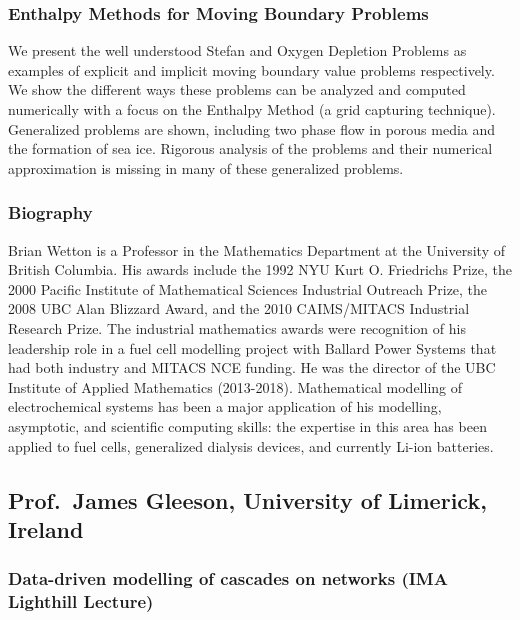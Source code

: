 \documentclass[12pt,a4paper]{article}
\begin{document}
\subsubsection{Enthalpy Methods for Moving Boundary Problems}

We present the well understood Stefan and Oxygen Depletion Problems as examples of explicit and implicit moving boundary value problems respectively. We show the different ways these problems can be analyzed and computed numerically with a focus on the Enthalpy Method (a grid capturing technique). Generalized problems are shown, including two phase flow in porous media and the formation of sea ice. Rigorous analysis of the problems and their numerical approximation is missing in many of these generalized problems. 

\subsubsection{Biography}

Brian Wetton is a Professor in the Mathematics Department at the University of British Columbia. His awards include the 1992 NYU Kurt O. Friedrichs Prize, the 2000 Pacific Institute of Mathematical Sciences Industrial Outreach Prize, the 2008 UBC Alan Blizzard Award, and the 2010 CAIMS/MITACS Industrial Research Prize. The industrial mathematics awards were recognition of his leadership role in a fuel cell modelling project with Ballard Power Systems that had both industry and MITACS NCE funding. He was the director of the UBC Institute of Applied Mathematics (2013-2018). Mathematical modelling of electrochemical systems has been a major application of his modelling, asymptotic, and scientific computing skills: the expertise in this area has been applied to fuel cells, generalized dialysis devices, and currently Li-ion batteries.

\subsection{Prof.~James Gleeson, University of Limerick, Ireland}

\subsubsection{Data-driven modelling of cascades on networks (IMA Lighthill Lecture)}
\end{document}
